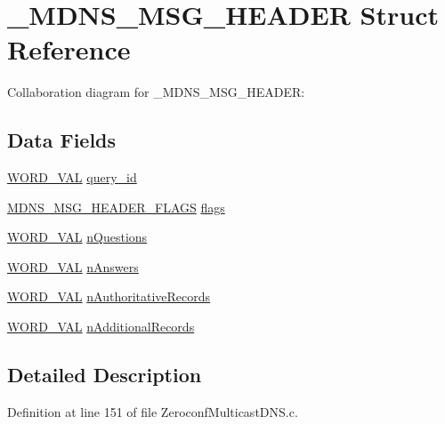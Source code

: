 \hypertarget{struct___m_d_n_s___m_s_g___h_e_a_d_e_r}{}\section{\+\_\+\+M\+D\+N\+S\+\_\+\+M\+S\+G\+\_\+\+H\+E\+A\+D\+E\+R Struct Reference}
\label{struct___m_d_n_s___m_s_g___h_e_a_d_e_r}


Collaboration diagram for \+\_\+\+M\+D\+N\+S\+\_\+\+M\+S\+G\+\_\+\+H\+E\+A\+D\+E\+R\+:
\subsection*{Data Fields}
\begin{DoxyCompactItemize}
\item 
\hyperlink{union_w_o_r_d___v_a_l}{W\+O\+R\+D\+\_\+\+V\+A\+L} \hyperlink{struct___m_d_n_s___m_s_g___h_e_a_d_e_r_ae41711aa22f2e8bc78a863b5d4c25a5a}{query\+\_\+id}
\item 
\hyperlink{_zeroconf_multicast_d_n_s_8c_a8a9bca37eb1fdea3b90dbb38986cd622}{M\+D\+N\+S\+\_\+\+M\+S\+G\+\_\+\+H\+E\+A\+D\+E\+R\+\_\+\+F\+L\+A\+G\+S} \hyperlink{struct___m_d_n_s___m_s_g___h_e_a_d_e_r_a504bb75298f1dba663cba7c5253f8c50}{flags}
\item 
\hyperlink{union_w_o_r_d___v_a_l}{W\+O\+R\+D\+\_\+\+V\+A\+L} \hyperlink{struct___m_d_n_s___m_s_g___h_e_a_d_e_r_a53e1fb5903670425c5e04a26647e4ff8}{n\+Questions}
\item 
\hyperlink{union_w_o_r_d___v_a_l}{W\+O\+R\+D\+\_\+\+V\+A\+L} \hyperlink{struct___m_d_n_s___m_s_g___h_e_a_d_e_r_ae162e3cd05524c94fb194c4f30a577b8}{n\+Answers}
\item 
\hyperlink{union_w_o_r_d___v_a_l}{W\+O\+R\+D\+\_\+\+V\+A\+L} \hyperlink{struct___m_d_n_s___m_s_g___h_e_a_d_e_r_aa81791759b0cc35924f97b431c59f859}{n\+Authoritative\+Records}
\item 
\hyperlink{union_w_o_r_d___v_a_l}{W\+O\+R\+D\+\_\+\+V\+A\+L} \hyperlink{struct___m_d_n_s___m_s_g___h_e_a_d_e_r_a6b6bce492ca8d67cc5784105bc2b7bc5}{n\+Additional\+Records}
\end{DoxyCompactItemize}


\subsection{Detailed Description}


Definition at line 151 of file Zeroconf\+Multicast\+D\+N\+S.\+c.



